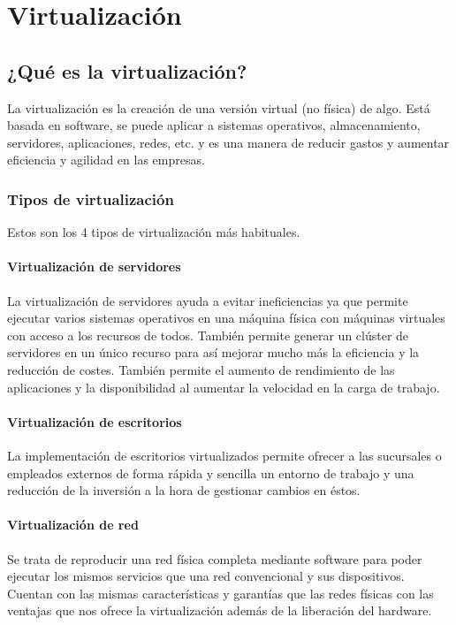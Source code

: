 \chapter{Virtualización}

\section{¿Qué es la virtualización?}

La virtualización es la creación de una versión virtual (no física) de algo. Está basada en software, se puede aplicar a sistemas operativos, almacenamiento, servidores, aplicaciones, redes, etc. y es una manera de reducir gastos y aumentar eficiencia y agilidad en las empresas.

\subsection{Tipos de virtualización}

Estos son los 4 tipos de virtualización más habituales.
\subsubsection{Virtualización de servidores}

La virtualización de servidores ayuda a evitar ineficiencias ya que permite ejecutar varios sistemas operativos en una máquina física con máquinas virtuales con acceso a los recursos de todos. También permite generar un clúster de servidores en un único recurso para así mejorar mucho más la eficiencia y la reducción de costes. También permite el aumento de rendimiento de las aplicaciones y la disponibilidad al aumentar la velocidad en la carga de trabajo.

\subsubsection{Virtualización de escritorios}

La implementación de escritorios virtualizados permite ofrecer a las sucursales o empleados externos de forma rápida y sencilla un entorno de trabajo y una reducción de la inversión a la hora de gestionar cambios en éstos.

\subsubsection{Virtualización de red}

Se trata de reproducir una red física completa mediante software para poder ejecutar los mismos servicios que una red convencional y sus dispositivos. Cuentan con las mismas características y garantías que las redes físicas con las ventajas que nos ofrece la virtualización además de la liberación del hardware.

